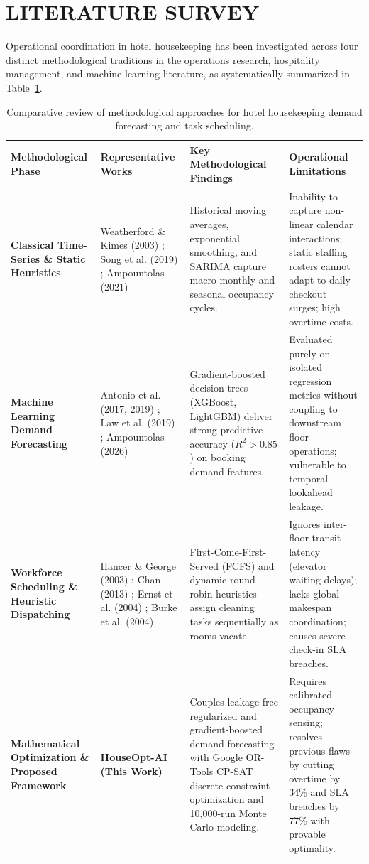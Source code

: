 \documentclass[11pt,a4paper]{article}
\begin{document}
\section{LITERATURE SURVEY}

Operational coordination in hotel housekeeping has been investigated across four distinct methodological traditions in the operations research, hospitality management, and machine learning literature, as systematically summarized in Table~\ref{tab:literature_comparison}.

\begin{table}[t]
\centering
\small
\caption{Comparative review of methodological approaches for hotel housekeeping demand forecasting and task scheduling.}
\label{tab:literature_comparison}
\begin{tabularx}{\textwidth}{p{2.6cm} p{3.0cm} X X}
\toprule
\textbf{Methodological Phase} & \textbf{Representative Works} & \textbf{Key Methodological Findings} & \textbf{Operational Limitations} \\
\midrule
\textbf{Classical Time-Series \& Static Heuristics} & 
Weatherford \& Kimes (2003) \cite{weatherford2003}; Song et al. (2019) \cite{song2019}; Ampountolas (2021) \cite{ampountolas2021} & 
Historical moving averages, exponential smoothing, and SARIMA capture macro-monthly and seasonal occupancy cycles. & 
Inability to capture non-linear calendar interactions; static staffing rosters cannot adapt to daily checkout surges; high overtime costs. \\
\addlinespace
\textbf{Machine Learning Demand Forecasting} & 
Antonio et al. (2017, 2019) \cite{antonio2017,antonio2019bigdata}; Law et al. (2019) \cite{law2019}; Ampountolas (2026) \cite{ampountolas2026} & 
Gradient-boosted decision trees (XGBoost, LightGBM) deliver strong predictive accuracy ($R^2 > 0.85$) on booking demand features. & 
Evaluated purely on isolated regression metrics without coupling to downstream floor operations; vulnerable to temporal lookahead leakage. \\
\addlinespace
\textbf{Workforce Scheduling \& Heuristic Dispatching} & 
Hancer \& George (2003) \cite{hancer2003}; Chan (2013) \cite{chan2013}; Ernst et al. (2004) \cite{ernst2004}; Burke et al. (2004) \cite{burke2004} & 
First-Come-First-Served (FCFS) and dynamic round-robin heuristics assign cleaning tasks sequentially as rooms vacate. & 
Ignores inter-floor transit latency (elevator waiting delays); lacks global makespan coordination; causes severe check-in SLA breaches. \\
\addlinespace
\textbf{Mathematical Optimization \& Proposed Framework} & 
\textbf{HouseOpt-AI (This Work)} & 
Couples leakage-free regularized and gradient-boosted demand forecasting with Google OR-Tools CP-SAT discrete constraint optimization and 10,000-run Monte Carlo modeling. & 
Requires calibrated occupancy sensing; resolves previous flaws by cutting overtime by 34\% and SLA breaches by 77\% with provable optimality. \\
\bottomrule
\end{tabularx}
\end{table}
\end{document}
